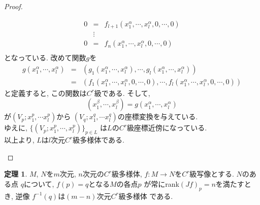\documentclass[a4j,12pt]{jarticle}
\theoremstyle{definition}
\newtheorem{theorem}{定理}[section]
\begin{document}
\begin{proof}
\begin{itemize}
\begin{eqnarray*}
            0&=&f_{l+1}(x^\alpha_1, \cdots ,x^\alpha_l,0,\cdots ,0)\\
            &\vdots& \\
            0&=&f_n(x^\alpha_1, \cdots ,x^\alpha_l,0,\cdots ,0)\\
        \end{eqnarray*}
        となっている. 改めて関数$g$を
        \begin{eqnarray*}
            g(x^\alpha_1, \cdots ,x^\alpha_l)&=&
            (g_1(x^\alpha_1, \cdots ,x^\alpha_l), \cdots 
            , g_l(x^\alpha_1, \cdots ,x^\alpha_l))\\
            &=&(f_1(x^\alpha_1, \cdots ,x^\alpha_l,0,\cdots ,0), \cdots 
            , f_l(x^\alpha_1, \cdots ,x^\alpha_l,0,\cdots ,0))
        \end{eqnarray*}
        と定義すると, この関数は$C^r$級である. 
        そして, 
        $$(x^\beta_1, \cdots ,x^\beta_l)
        =g(x^\alpha_1, \cdots ,x^\alpha_l)$$
        が$(V_p;x^p_1,\cdots x^p_l)$から
        $(V_q;x^q_1,\cdots x^q_l)$の座標変換を与えている. \\
        ゆえに, $\{(V_p;x^p_1,\cdots ,x^p_l)\}_{p\in L}$
        は$L$の$C^r$級座標近傍になっている. \\
        以上より, $L$は$l$次元$C^r$級多様体である. 
    \end{itemize}
\end{proof}
\begin{theorem}\label{theo:f^{-1}(q) C^r manifold}
    $M$, $N$を$m$次元, $n$次元の$C^r$級多様体, 
    $f:M\to N$を$C^r$級写像とする. $N$のある点
    $q$について, $f(p)=q$となる$M$の各点$p$
    が常にrank$(Jf)_p=n$を満たすとき, 逆像
    $f^{-1}(q)$は$(m-n)$次元$C^r$級多様体
    である. 
\end{theorem}
\end{document}
